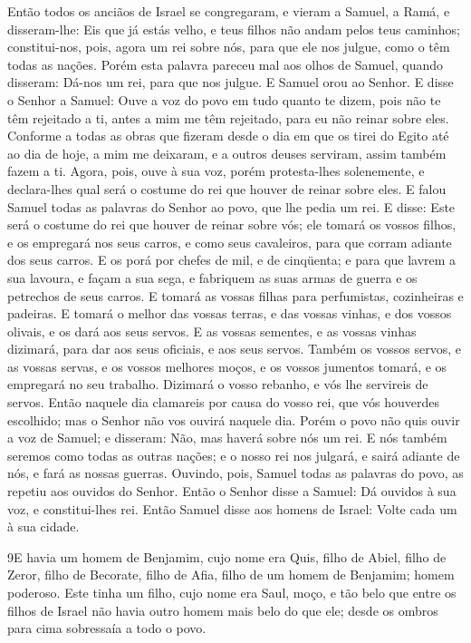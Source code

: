 Então todos os anciãos de Israel se congregaram, e vieram a
Samuel, a Ramá, e disseram-lhe: Eis que já estás velho, e teus
filhos não andam pelos teus caminhos; constitui-nos, pois, agora um
rei sobre nós, para que ele nos julgue, como o têm todas as nações.
Porém esta palavra pareceu mal aos olhos de Samuel, quando
disseram: Dá-nos um rei, para que nos julgue. E Samuel orou ao
Senhor. E disse o Senhor a Samuel: Ouve a voz do povo em tudo
quanto te dizem, pois não te têm rejeitado a ti, antes a mim me têm
rejeitado, para eu não reinar sobre eles. Conforme a todas as
obras que fizeram desde o dia em que os tirei do Egito até ao dia de
hoje, a mim me deixaram, e a outros deuses serviram, assim também
fazem a ti. Agora, pois, ouve à sua voz, porém protesta-lhes
solenemente, e declara-lhes qual será o costume do rei que houver de
reinar sobre eles. E falou Samuel todas as palavras do Senhor
ao povo, que lhe pedia um rei. E disse: Este será o costume
do rei que houver de reinar sobre vós; ele tomará os vossos filhos,
e os empregará nos seus carros, e como seus cavaleiros, para que
corram adiante dos seus carros. E os porá por chefes de mil,
e de cinqüenta; e para que lavrem a sua lavoura, e façam a sua sega,
e fabriquem as suas armas de guerra e os petrechos de seus carros.
E tomará as vossas filhas para perfumistas, cozinheiras e
padeiras. E tomará o melhor das vossas terras, e das vossas
vinhas, e dos vossos olivais, e os dará aos seus servos. E as
vossas sementes, e as vossas vinhas dizimará, para dar aos seus
oficiais, e aos seus servos. Também os vossos servos, e as
vossas servas, e os vossos melhores moços, e os vossos jumentos
tomará, e os empregará no seu trabalho. Dizimará o vosso
rebanho, e vós lhe servireis de servos. Então naquele dia
clamareis por causa do vosso rei, que vós houverdes escolhido; mas o
Senhor não vos ouvirá naquele dia. Porém o povo não quis
ouvir a voz de Samuel; e disseram: Não, mas haverá sobre nós um rei.
E nós também seremos como todas as outras nações; e o nosso
rei nos julgará, e sairá adiante de nós, e fará as nossas guerras.
Ouvindo, pois, Samuel todas as palavras do povo, as repetiu
aos ouvidos do Senhor. Então o Senhor disse a Samuel: Dá
ouvidos à sua voz, e constitui-lhes rei. Então Samuel disse aos
homens de Israel: Volte cada um à sua cidade.

\medskip

\lettrine{9} E havia um homem de Benjamim, cujo nome era Quis,
filho de Abiel, filho de Zeror, filho de Becorate, filho de Afia,
filho de um homem de Benjamim; homem poderoso. Este tinha um
filho, cujo nome era Saul, moço, e tão belo que entre os filhos de
Israel não havia outro homem mais belo do que ele; desde os ombros
para cima sobressaía a todo o povo.

